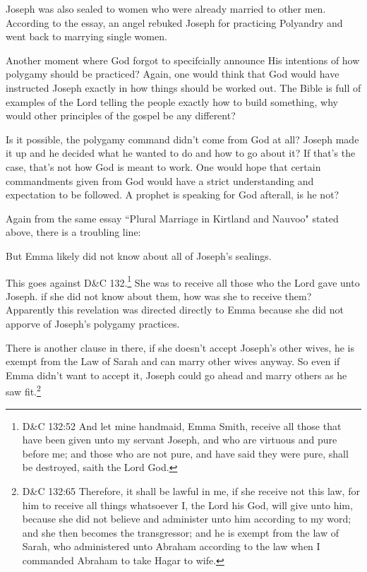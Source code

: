 Joseph was also sealed to women who were already married to other men. According to
the essay, an angel rebuked Joseph for practicing Polyandry and went back to marrying
single women.

Another moment where God forgot to specifcially announce His intentions of how
polygamy should be practiced? Again, one would think that God would have instructed
Joseph exactly in how things should be worked out. The Bible is full of examples
of the Lord telling the people exactly how to build something, why would other
principles of the gospel be any different?

Is it possible, the polygamy command didn't come from God at all? Joseph made it up
and he decided what he wanted to do and how to go about it? If that's the case,
that's not how God is meant to work. One would hope that certain commandments given
from God would have a strict understanding and expectation to be followed. A prophet
is speaking for God afterall, is he not?

Again from the same essay ``Plural Marriage in Kirtland and Nauvoo" stated above,
there is a troubling line:

\begin{displayquote}
But Emma likely did not know about all of Joseph's sealings.
\end{displayquote}

This goes against D\&C 132.\footnote{
D\&C 132:52 And let mine handmaid, Emma Smith, receive all those that have been 
given unto my servant Joseph, and who are virtuous and pure before me; and those 
who are not pure, and have said they were pure, shall be destroyed, saith the 
Lord God.
} She was to receive all those who the Lord gave unto Joseph. if she did not know
about them, how was she to receive them? Apparently this revelation was directed
directly to Emma because she did not apporve of Joseph's polygamy practices.

There is another clause in there, if she doesn't accept Joseph's other wives, he is
exempt from the Law of Sarah and can marry other wives anyway. So even if Emma didn't
want to accept it, Joseph could go ahead and marry others as he saw fit.\footnote{
D\&C 132:65 Therefore, it shall be lawful in me, if she receive not this law, for him
to receive all things whatsoever I, the Lord his God, will give unto him, because she
did not believe and administer unto him according to my word; and she then becomes
the transgressor; and he is exempt from the law of Sarah, who administered unto
Abraham according to the law when I commanded Abraham to take Hagar to wife.
}

